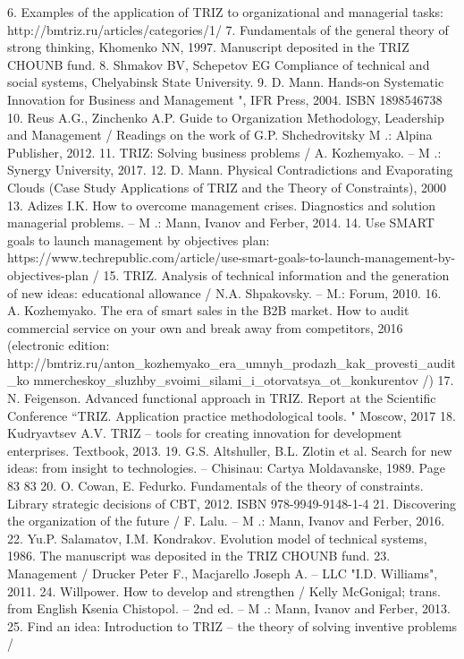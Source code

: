 6. Examples of the application of TRIZ to organizational and managerial tasks:
http://bmtriz.ru/articles/categories/1/
7. Fundamentals of the general theory of strong thinking, Khomenko NN, 1997. Manuscript
deposited in the TRIZ CHOUNB fund.
8. Shmakov BV, Schepetov EG Compliance of technical and
social systems, Chelyabinsk State University.
9. D. Mann. Hands-on Systematic Innovation for Business and Management ", IFR
Press, 2004. ISBN 1898546738
10. Reus A.G., Zinchenko A.P. Guide to Organization Methodology,
Leadership and Management / Readings on the work of G.P. Shchedrovitsky
M .: Alpina Publisher, 2012.
11. TRIZ: Solving business problems / A. Kozhemyako. -- M .: Synergy University,
2017.
12. D. Mann. Physical Contradictions and Evaporating Clouds (Case Study
Applications of TRIZ and the Theory of Constraints), 2000
13. Adizes I.K. How to overcome management crises. Diagnostics and solution
managerial problems. -- M .: Mann, Ivanov and Ferber, 2014.
14. Use SMART goals to launch management by objectives plan:
https://www.techrepublic.com/article/use-smart-goals-to-launch-management-by-
objectives-plan /
15. TRIZ. Analysis of technical information and the generation of new ideas: educational
allowance / N.A. Shpakovsky. -- M.: Forum, 2010.
16. A. Kozhemyako. The era of smart sales in the B2B market. How to audit
commercial service on your own and break away from competitors, 2016
(electronic edition:
http://bmtriz.ru/anton_kozhemyako_era_umnyh_prodazh_kak_provesti_audit_ko
mmercheskoy_sluzhby_svoimi_silami_i_otorvatsya_ot_konkurentov /)
17. N. Feigenson. Advanced functional approach in TRIZ.
Report at the Scientific Conference “TRIZ. Application practice
methodological tools. " Moscow, 2017
18. Kudryavtsev A.V. TRIZ -- tools for creating innovation for development
enterprises. Textbook, 2013.
19. G.S. Altshuller, B.L. Zlotin et al. Search for new ideas: from insight to
technologies. -- Chisinau: Cartya Moldavanske, 1989.
Page 83
83
20. O. Cowan, E. Fedurko. Fundamentals of the theory of constraints. Library
strategic decisions of CBT, 2012. ISBN 978-9949-9148-1-4
21. Discovering the organization of the future / F. Lalu. -- M .: Mann, Ivanov and Ferber,
2016.
22. Yu.P. Salamatov, I.M. Kondrakov. Evolution model of technical systems,
1986. The manuscript was deposited in the TRIZ CHOUNB fund.
23. Management / Drucker Peter F., Macjarello Joseph A. -- LLC
"I.D. Williams", 2011.
24. Willpower. How to develop and strengthen / Kelly McGonigal; trans. from English Ksenia
Chistopol. -- 2nd ed. -- M .: Mann, Ivanov and Ferber, 2013.
25. Find an idea: Introduction to TRIZ -- the theory of solving inventive problems /
